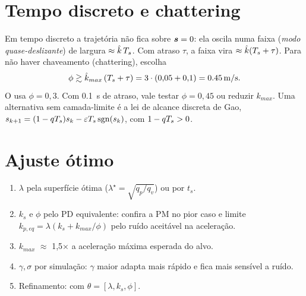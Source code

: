 \section{Tempo discreto e chattering}
Em tempo discreto a trajetória não fica sobre $\bm{s}=0$: ela oscila numa faixa
(\emph{modo quase-deslizante}) de largura $\approx\hat k\,T_s$. Com atraso $\tau$, a
faixa vira $\approx \hat k(T_s+\tau)$. Para não haver chaveamento (chattering), escolha
\begin{equation}
  \phi \gtrsim \hat k_{max}\,(T_s + \tau) = 3\cdot(0{,}05+0{,}1) = \SI{0,45}{m/s}.
\end{equation}
O  usa $\phi=0{,}3$. Com \SI{0,1}{s} de atraso, vale testar $\phi=0{,}45$ ou
reduzir $k_{max}$. Uma alternativa sem camada-limite é a lei de alcance discreta de
Gao, $s_{k+1}=(1-qT_s)s_k-\varepsilon T_s\operatorname{sgn}(s_k)$, com $1-qT_s>0$.

\section{Ajuste ótimo}
\begin{enumerate}
  \item $\lambda$ pela superfície ótima ($\lambda^\star=\sqrt{q_p/q_v}$) ou por $t_s$.
  \item $k_s$ e $\phi$ pelo PD equivalente: confira a PM no pior caso e limite
        $k_{p,eq}=\lambda(k_s+k_{max}/\phi)$ pelo ruído aceitável na aceleração.
  \item $k_{max}$ $\approx$ 1,5$\times$ a aceleração máxima esperada do alvo.
  \item $\gamma,\sigma$ por simulação: $\gamma$ maior adapta mais rápido e fica mais
        sensível a ruído.
  \item Refinamento:  com $\theta=[\lambda,k_s,\phi]$.
\end{enumerate}
